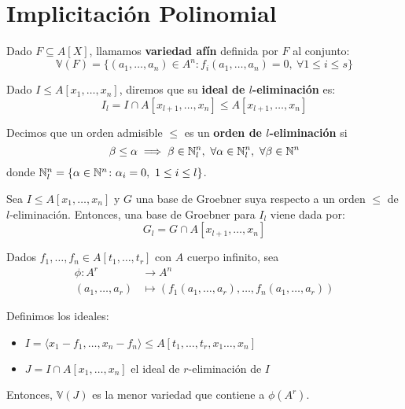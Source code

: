 \section{Implicitación Polinomial}

\begin{definicion}Dado $F \subseteq A[X]$, llamamos \textbf{variedad afín} definida por $F$ al conjunto:
    \begin{equation*}
        \mathbb{V}(F) = \{(a_1,\dots, a_n)\in A^n : f_i(a_1,\dots, a_n)=0,\ \forall 1\le i \le s\}
    \end{equation*}
\end{definicion}

\begin{definicion}
    Dado $I\le A[x_1,\dots,x_n]$, diremos que su \textbf{ideal de $l$-eliminación} es:
    \begin{equation*}
        I_l = I \cap A[x_{l+1}, \dots, x_n] \le A[x_{l+1}, \dots, x_n]
    \end{equation*}
\end{definicion}

\begin{definicion}
    Decimos que un orden admisible $\le$ es un \textbf{orden de $l$-eliminación} si 
    $$\beta\le \alpha \implies \beta \in \mathbb{N}_l^n,\ \forall \alpha \in \mathbb{N}_l^n,\ \forall \beta \in \mathbb{N}^n$$
    donde $\mathbb{N}_l^n = \{\alpha\in \mathbb{N}^n \colon \alpha_i =0,\ 1\le i \le l\}$.
\end{definicion}

\begin{teorema}[Eliminación]
    Sea $I\le A[x_1,\dots,x_n]$ y $G$ una base de Groebner suya respecto a un orden $\le$ de $l$-eliminación. Entonces, una base de Groebner para $I_l$ viene dada por:
    \begin{equation*}
        G_l = G\cap A[x_{l+1},\dots, x_n]
    \end{equation*}
\end{teorema}

\begin{teorema}
    Dados $f_1,\dots, f_n \in A[t_1, \dots, t_r]$ con $A$ cuerpo infinito, sea
    \begin{align*}
        \phi \colon A^r  & \to A^n\\
        (a_1,\dots, a_r) & \mapsto \left( f_1(a_1,\dots, a_r), \dots, f_n(a_1,\dots, a_r) \right)
    \end{align*}

    Definimos los ideales:
    \begin{itemize}
        \item $I = \langle x_1-f_1,\dots,  x_n-f_n\rangle \le A[t_1,\dots, t_r,x_1\dots, x_n]$
        \item $J = I\cap A[x_1,\dots, x_n]$ el ideal de $r$-eliminación de $I$
    \end{itemize}

    Entonces, $\mathbb{V}(J)$ es la menor variedad que contiene a $\phi(A^r)$.
\end{teorema}
